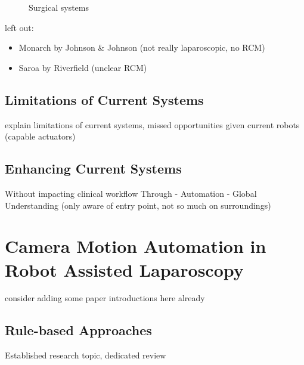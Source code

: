 \begin{figure}
\begin{subfigure}[b]{0.49\textwidth}
    \end{subfigure}
    \caption{Surgical systems}
    \label{in:fig:surgical_systems}
\end{figure}

left out:

\begin{itemize}
    \item Monarch by Johnson \& Johnson (not really laparoscopic, no RCM)
    \item Saroa by Riverfield (unclear RCM)
\end{itemize}

\subsection{Limitations of Current Systems}

explain limitations of current systems, missed opportunities given current robots (capable actuators)

\subsection{Enhancing Current Systems}
Without impacting clinical workflow
Through
- Automation
- Global Understanding (only aware of entry point, not so much on surroundings)

\section{Camera Motion Automation in Robot Assisted Laparoscopy}
consider adding some paper introductions here already

\subsection{Rule-based Approaches}
Established research topic, dedicated review

